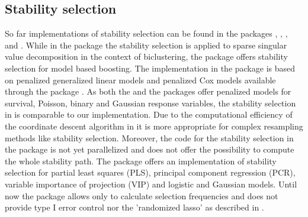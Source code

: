 \documentclass[]{jss}
\begin{document}
\subsection{Stability selection}

So far implementations of stability selection can be found in the packages , \citep{s4vd,sill2011robust},  \citep{mboost},  \citep{lol} and  \citep{BioMark}. While in the package  the stability selection is applied to sparse singular value decomposition in the context of biclustering, the  package offers stability selection for model based boosting. The implementation in the  package is based on penalized generalized linear models and penalized Cox models available through the package  \citep{penalized}.  As both the  and the  packages offer penalized models for survival, Poisson, binary and Gaussian response variables, the stability selection in  is comparable to our implementation. Due to the computational efficiency of the coordinate descent algorithm in  it is more appropriate for complex resampling methods like stability selection. Moreover, the code for the stability selection in the  package is not yet parallelized and does not offer the possibility to compute the whole stability path. The  package offers an implementation of stability selection for partial least squares (PLS), principal component regression (PCR), variable importance of projection (VIP) and logistic and Gaussian  models. Until now the  package allows only to calculate selection frequencies and does not provide type I error control nor the 'randomized lasso' as described in \citet{MeinshausenBuehlmann2010}. \\
\end{document}
